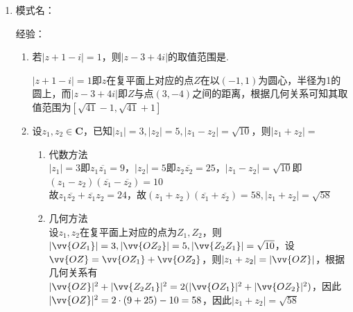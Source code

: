 \begin{enumerate}
    \begin{enumerate}
        \item 求下列复数的模： $(3+4i)\left(-\dfrac{1}{2} + \dfrac{\sqrt{3}}{2}i\right)$；$\dfrac{5-12i}{-8+15i}$
        \begin{jieda}
            $\left|(3+4i)\left(-\dfrac{1}{2} + \dfrac{\sqrt{3}}{2}i\right)\right| = |(3+4i)|\cdot\left|\left(-\dfrac{1}{2} + \dfrac{\sqrt{3}}{2}i\right)\right| = 5 \cdot 1 = 5$ \\
            $\left |\dfrac{5-12i}{-8+15i} \right | = \dfrac{|5-12i|}{|-8+15i|} = \dfrac{13}{17}$
        \end{jieda}
    \end{enumerate}

    \item 模式名：
    
    经验：
    
    \begin{enumerate}
        \item 若$|z + 1 - i| = 1$，则$|z - 3 + 4i|$的取值范围是.
        \begin{jieda}
            $|z + 1 - i| = 1$即$z$在复平面上对应的点$Z$在以$(-1, 1)$为圆心，半径为1的圆上，而$|z - 3 + 4i|$即$Z$与点$(3, -4)$之间的距离，根据几何关系可知其取值范围为$[\sqrt{41}-1, \sqrt{41}+1]$
        \end{jieda}

        
    \item 设$z_1, z_2 \in \mathbf{C}$，已知$|z_1| = 3, |z_2| = 5, |z_1 - z_2| = \sqrt{10}$，则$|z_1+z_2| = $
    \begin{jieda}
        \begin{enumerate}
            \item 代数方法 \\
            $|z_1| = 3$即$z_1 \overline{z_1} = 9$，$|z_2| = 5$即$z_2 \overline{z_2} = 25$，$|z_1 - z_2| = \sqrt{10}$即$(z_1 - z_2)(\overline{z_1} - \overline{z_2}) = 10$ \\
            故$z_1\overline{z_2} + \overline{z_1}z_2 = 24$，故$(z_1 + z_2)(\overline{z_1} + \overline{z_2}) = 58, |z_1+z_2| = \sqrt{58}$
            \item 几何方法 \\
            设$z_1, z_2$在复平面上对应的点为$Z_1, Z_2$，则$|\vv{OZ_1}| = 3, |\vv{OZ_2}|=5, |\vv{Z_2Z_1}| = \sqrt{10}$，设$\vv{OZ} = \vv{OZ_1} + \vv{OZ_2}$，则$|z_1 + z_2| = |\vv{OZ}|$，根据几何关系有$|\vv{OZ}|^2 + |\vv{Z_2Z_1}|^2 = 2(|\vv{OZ_1}|^2+|\vv{OZ_2}|^2)$，因此$|\vv{OZ}|^2 = 2\cdot(9+25) - 10 = 58$，因此$|z_1+z_2| = \sqrt{58}$
        \end{enumerate}
        

\end{jieda}
\end{enumerate}
\end{enumerate}
